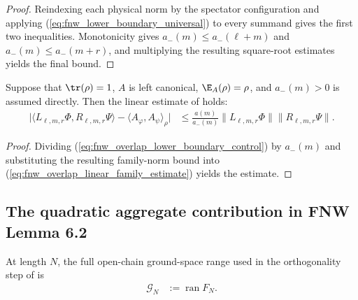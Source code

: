 \begin{proof}
    \leanok
    Reindexing each physical norm by the spectator configuration and applying
    (\ref{eq:fnw_lower_boundary_universal}) to every summand gives the first
    two inequalities. Monotonicity gives $a_-(m)\leq a_-(\ell+m)$ and
    $a_-(m)\leq a_-(m+r)$, and multiplying the resulting square-root estimates
    yields the final bound.
\end{proof}

\begin{lemma}
    \label{thm:fnw_equation_6_5_linear}
    \leanok
    Suppose that $\tr(\rho)=1$, $A$ is left canonical,
    $\E_A(\rho)=\rho$, and $a_-(m)>0$ is assumed directly. Then the linear
    estimate of \cite[Equation~(6.5)]{Fannes1992Finitely} holds:
    \begin{align}
        \bigl|\langle L_{\ell,m,r}\Phi,R_{\ell,m,r}\Psi\rangle
        -\langle A_\varphi,A_\psi\rangle_\rho\bigr|
         & \leq\frac{a(m)}{a_-(m)}
        \lVert L_{\ell,m,r}\Phi\rVert
        \lVert R_{\ell,m,r}\Psi\rVert.
        \label{eq:fnw_equation_6_5_linear}
    \end{align}
\end{lemma}

\begin{proof}
    \leanok
    Dividing (\ref{eq:fnw_overlap_lower_boundary_control}) by $a_-(m)$ and
    substituting the resulting family-norm bound into
    (\ref{eq:fnw_overlap_linear_family_estimate}) yields the estimate.
\end{proof}


\subsection{The quadratic aggregate contribution in FNW Lemma 6.2}
\label{subsec:fnw_quadratic_aggregate_estimate}

\begin{definition}
    \label{def:fnw_boundary_range}
    \leanok
    At length $N$, the full open-chain ground-space range used in the
    orthogonality step of \cite[Lemma~6.2]{Fannes1992Finitely} is
    \begin{align}
        \mathcal G_N & :=\operatorname{ran}F_N.
        \label{eq:fnw_boundary_range}
    \end{align}
\end{definition}

